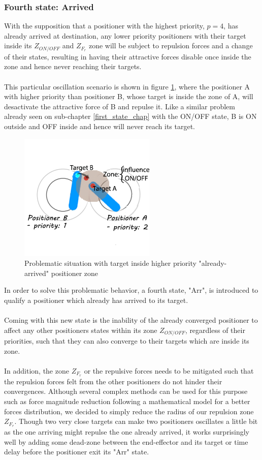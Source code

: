 \documentclass[]{spie}  %
\begin{document}
	\subsubsection{Fourth state: Arrived}
	\label{sub_chap_fourth_state}
	With the supposition that a positioner with the highest priority, $p = 4$, has already arrived at destination, any lower priority positioners with their target inside its $Z_{ON/OFF}$ and $Z_{F_{r}}$ zone will be subject to repulsion forces and a change of their states, resulting in having their attractive forces disable once inside the zone and hence never reaching their targets.\\
	\\
	This particular oscillation scenario is shown in figure \ref{fourth_state}, where the positioner A with higher priority than positioner B, whose target is inside the zone of A, will desactivate the attractive force of B and repulse it. Like a similar problem already seen on sub-chapter \ref{first_state_chap} with the ON/OFF state, B is ON outside and OFF inside and hence will never reach its target.
	\begin{figure}[H]
		\centering
		\includegraphics[scale=0.64]{images/fourth_state.jpg}
		\caption{\centering	Problematic situation with target inside higher priority "already-arrived" positioner zone}
		\label{fourth_state}
	\end{figure}
	In order to solve this problematic behavior, a fourth state, "Arr", is introduced to qualify a positioner which already has arrived to its target. \\\\
	Coming with this new state is the inability of the already converged positioner to affect any other positioners states within its zone $Z_{ON/OFF}$, regardless of their priorities, such that they can also converge to their targets which are inside its zone.\\\\
	In addition, the zone $Z_{F_{r}}$  or the repulsive forces needs to be mitigated such that the repulsion forces felt from the other positioners do not hinder their convergences. Although several complex methods can be used for this purpose such as force magnitude reduction following a mathematical model for a better forces distribution, we decided to simply reduce the radius of our repulsion zone $Z_{F_{r}}$. Though two very close targets can make two positioners oscillates a little bit as the one arriving might repulse the one already arrived, it works surprisingly well by adding some dead-zone between the end-effector and its target or time delay before the positioner exit its "Arr" state.  
	
\end{document}
